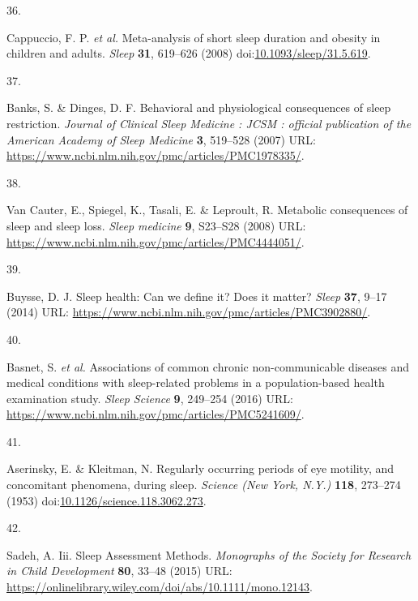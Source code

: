 \documentclass[
  10pt,
]{scrbook}
\newlength{\cslhangindent}
\newlength{\csllabelwidth}
\newlength{\cslentryspacingunit} %
\newenvironment{CSLReferences}[2] %
 {%
  \setlength{\parindent}{0pt}
  \ifodd #1
  \let\oldpar\par
  \def\par{\hangindent=\cslhangindent\oldpar}
  \fi
  \setlength{\parskip}{#2\cslentryspacingunit}
 }%
 {}
\newcommand{\CSLLeftMargin}[1]{\parbox[t]{\csllabelwidth}{#1}}
\newcommand{\CSLRightInline}[1]{\parbox[t]{\linewidth - \csllabelwidth}{#1}\break}
\let\originaltextbf\textbf
\renewcommand{\textbf}[1]{\textcolor{color1}{\textsf{\originaltextbf{#1}}}}
\begin{document}
\begin{CSLReferences}{0}{0}
\leavevmode{}%
\CSLLeftMargin{36. }%
\CSLRightInline{Cappuccio, F. P. \emph{et al.} Meta-analysis of short
sleep duration and obesity in children and adults. \emph{Sleep}
\textbf{31}, 619--626 (2008)
doi:\href{https://doi.org/10.1093/sleep/31.5.619}{10.1093/sleep/31.5.619}.}

\leavevmode{}%
\CSLLeftMargin{37. }%
\CSLRightInline{Banks, S. \& Dinges, D. F. Behavioral and physiological
consequences of sleep restriction. \emph{Journal of Clinical Sleep
Medicine : JCSM : official publication of the American Academy of Sleep
Medicine} \textbf{3}, 519--528 (2007) URL:
\url{https://www.ncbi.nlm.nih.gov/pmc/articles/PMC1978335/}.}

\leavevmode{}%
\CSLLeftMargin{38. }%
\CSLRightInline{Van Cauter, E., Spiegel, K., Tasali, E. \& Leproult, R.
Metabolic consequences of sleep and sleep loss. \emph{Sleep medicine}
\textbf{9}, S23--S28 (2008) URL:
\url{https://www.ncbi.nlm.nih.gov/pmc/articles/PMC4444051/}.}

\leavevmode{}%
\CSLLeftMargin{39. }%
\CSLRightInline{Buysse, D. J. Sleep health: Can we define it? Does it
matter? \emph{Sleep} \textbf{37}, 9--17 (2014) URL:
\url{https://www.ncbi.nlm.nih.gov/pmc/articles/PMC3902880/}.}

\leavevmode{}%
\CSLLeftMargin{40. }%
\CSLRightInline{Basnet, S. \emph{et al.} Associations of common chronic
non-communicable diseases and medical conditions with sleep-related
problems in a population-based health examination study. \emph{Sleep
Science} \textbf{9}, 249--254 (2016) URL:
\url{https://www.ncbi.nlm.nih.gov/pmc/articles/PMC5241609/}.}

\leavevmode{}%
\CSLLeftMargin{41. }%
\CSLRightInline{Aserinsky, E. \& Kleitman, N. Regularly occurring
periods of eye motility, and concomitant phenomena, during sleep.
\emph{Science (New York, N.Y.)} \textbf{118}, 273--274 (1953)
doi:\href{https://doi.org/10.1126/science.118.3062.273}{10.1126/science.118.3062.273}.}

\leavevmode{}%
\CSLLeftMargin{42. }%
\CSLRightInline{Sadeh, A. Iii. Sleep Assessment Methods.
\emph{Monographs of the Society for Research in Child Development}
\textbf{80}, 33--48 (2015) URL:
\url{https://onlinelibrary.wiley.com/doi/abs/10.1111/mono.12143}.}


\end{CSLReferences}
\end{document}
